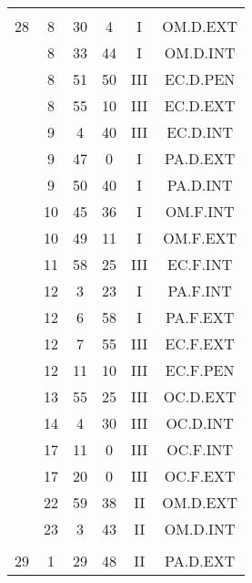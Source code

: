 \documentclass[12pt, a4paper]{article}
\begin{document}
\begin{multicols}{3}
{\begin{tabular}{c c c c c c}
	 	 	 	 & & & & & \\%
	 	 	 	28 & 8 & 30 & 4 & I & OM.D.EXT\\%
	 	 	 	 & 8 & 33 & 44 & I & OM.D.INT\\%
	 	 	 	 & 8 & 51 & 50 & III & EC.D.PEN\\%
	 	 	 	 & 8 & 55 & 10 & III & EC.D.EXT\\%
	 	 	 	 & 9 & 4 & 40 & III & EC.D.INT\\%
	 	 	 	 & 9 & 47 & 0 & I & PA.D.EXT\\%
	 	 	 	 & 9 & 50 & 40 & I & PA.D.INT\\%
	 	 	 	 & 10 & 45 & 36 & I & OM.F.INT\\%
	 	 	 	 & 10 & 49 & 11 & I & OM.F.EXT\\%
	 	 	 	 & 11 & 58 & 25 & III & EC.F.INT\\%
	 	 	 	 & 12 & 3 & 23 & I & PA.F.INT\\%
	 	 	 	 & 12 & 6 & 58 & I & PA.F.EXT\\%
	 	 	 	 & 12 & 7 & 55 & III & EC.F.EXT\\%
	 	 	 	 & 12 & 11 & 10 & III & EC.F.PEN\\%
	 	 	 	 & 13 & 55 & 25 & III & OC.D.EXT\\%
	 	 	 	 & 14 & 4 & 30 & III & OC.D.INT\\%
	 	 	 	 & 17 & 11 & 0 & III & OC.F.INT\\%
	 	 	 	 & 17 & 20 & 0 & III & OC.F.EXT\\%
	 	 	 	 & 22 & 59 & 38 & II & OM.D.EXT\\%
	 	 	 	 & 23 & 3 & 43 & II & OM.D.INT\\%
	 	 	 	 & & & & & \\%
	 	 	 	29 & 1 & 29 & 48 & II & PA.D.EXT\\%

\end{tabular}}
\end{multicols}
\end{document}
